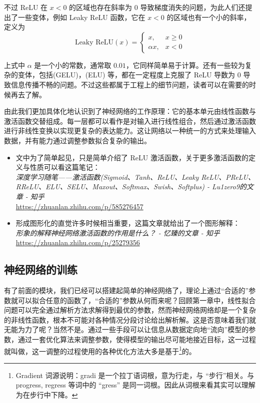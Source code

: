 不过 ReLU 在 $x<0$ 的区域也存在斜率为 $0$ 导致梯度消失的问题，为此人们还提出了一些变体，例如 Leaky ReLU 函数，它在 $x<0$ 的区域也有一个小的斜率，定义为
\[
    \text{Leaky ReLU}(x) = \begin{cases}
        x,        & x \geq 0 \\
        \alpha x, & x < 0
    \end{cases}
\]

上式中 $\alpha$ 是一个小的常数，通常取 $0.01$，它同样简单易于计算。还有一些较为复杂的变体，包括(GELU)，(ELU) 等，都在一定程度上克服了 ReLU 导数为 $0$ 导致信息传播不畅的问题。不过这些都属于工程上的细节问题，读者可以在需要的时候再去了解。

由此我们更加具体化地认识到了神经网络的工作原理：它的基本单元由线性函数与激活函数交替组成。每一层都可以看作是对输入进行线性组合，然后通过激活函数进行非线性变换以实现更复杂的表达能力。这让网络以一种统一的方式来处理输入数据，并有能力通过调整参数拟合复杂的输出。

\begin{tcolorbox}[myrecommendbox, title=推荐阅读, breakable=false]
    \begin{itemize}
        \item 文中为了简单起见，只是简单介绍了 ReLU 激活函数，关于更多激活函数的定义与性质可以看这篇笔记：\\
              \textit{深度学习随笔——激活函数(Sigmoid、Tanh、ReLU、Leaky ReLU、PReLU、RReLU、ELU、SELU、Maxout、Softmax、Swish、Softplus) - Lu1zero9的文章 - 知乎}\\
              \url{https://zhuanlan.zhihu.com/p/585276457}
        \item 形成图形化的直觉许多时候相当重要，这篇文章就给出了一个图形解释：\\
              \textit{形象的解释神经网络激活函数的作用是什么？ - 忆臻的文章 - 知乎}\\
              \url{https://zhuanlan.zhihu.com/p/25279356}
    \end{itemize}
\end{tcolorbox}

\newpage

\subsection{神经网络的训练}

有了前面的模块，我们已经可以搭建起简单的神经网络了，理论上通过“合适的”参数就可以拟合任意的函数了，“合适的”参数从何而来呢？回顾第一章中，线性拟合问题可以完全通过解析方法求解得到最优的参数，然而神经网络网络却是一个复杂的非线性函数，根本不可能对各种情况分段讨论给出解析解。这是否意味着我们就无能为力了呢？当然不是。通过一些手段可以让信息从数据定向地“流向”模型的参数，通过一套优化算法来调整参数，使得模型的输出尽可能地接近目标，这一过程就叫做，这一调整的过程使用的各种优化方法大多是基于\footnote{Gradient 词源说明：gradi 是一个拉丁语词根，意为行走，与 “步行”相关。与 progress, regress 等词中的 “gress” 是同一词根。因此从词根来看其实可以理解为在步行中下降。}的。

